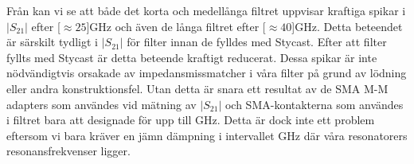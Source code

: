 \documentclass[main.tex]{subfiles}
\begin{document}
Från  kan vi se att både det korta och medellånga filtret uppvisar kraftiga spikar i $|S_{21}|$ efter \unit[$\approx 25$]{GHz} och även de långa filtret efter \unit[$\approx 40$]{GHz}. Detta beteendet är särskilt tydligt i $|S_{21}|$ för filter innan de fylldes med Stycast. Efter att filter fyllts med Stycast är detta beteende kraftigt reducerat. Dessa spikar är inte nödvändigtvis orsakade av impedansmissmatcher i våra filter på grund av lödning eller andra konstruktionsfel. Utan detta är snara ett resultat av de SMA M-M adapters som användes vid mätning av $|S_{21}|$ och SMA-kontakterna som användes i filtret bara att designade för upp till \unit[18]{GHz}. Detta är dock inte ett problem eftersom vi bara kräver en jämn dämpning i intervallet \unit[4-8]{GHz} där våra resonatorers resonansfrekvenser ligger.
\end{document}

